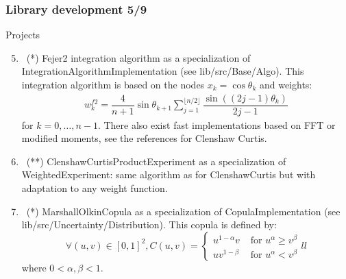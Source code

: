 \documentclass[8pt]{beamer}
\begin{document}
\begin{frame}
  \frametitle{Library development 5/9}
  \begin{block}{Projects}
    \begin{enumerate}
      \setcounter{enumi}{4}
    \item~(*) \alert{\ttfamily Fejer2} integration algorithm as a specialization of  \alert{\ttfamily IntegrationAlgorithmImplementation} (see {\ttfamily lib/src/Base/Algo}). This integration algorithm is based on the nodes $x_k=\cos\theta_k$ and weights:
      \begin{align}
        w_k^{f2}=\dfrac{4}{n+1}\sin\theta_{k+1}\sum_{j=1}^{\lfloor n/2\rfloor}\dfrac{\sin\left((2j-1)\theta_k\right)}{2j-1}
      \end{align}
      for $k=0,\dots,n-1$. There also exist fast implementations based on FFT or modified moments, see the references for Clenshaw Curtis.
    \item~(**) \alert{\ttfamily ClenshawCurtisProductExperiment} as a specialization of {\ttfamily WeightedExperiment}: same algorithm as for {\ttfamily ClenshawCurtis} but with adaptation to any weight function.
    \item~(*) \alert{\ttfamily MarshallOlkinCopula} as a specialization of {\ttfamily CopulaImplementation} (see {\ttfamily lib/src/Uncertainty/Distribution}). This copula is defined by:
      \begin{equation}
        \forall (u,v)\in[0,1]^2, C(u, v)=\left\{
          \begin{array}{ll}
            u^{1-\alpha}v & \mbox{ for }u^\alpha\geq v^\beta \\
            uv^{1-\beta} & \mbox{ for }u^\alpha< v^\beta
          \end{array}{ll}
        \right.
      \end{equation}
      where $0<\alpha, \beta<1$.
    \end{enumerate}
  \end{block}
\end{frame}
\end{document}
